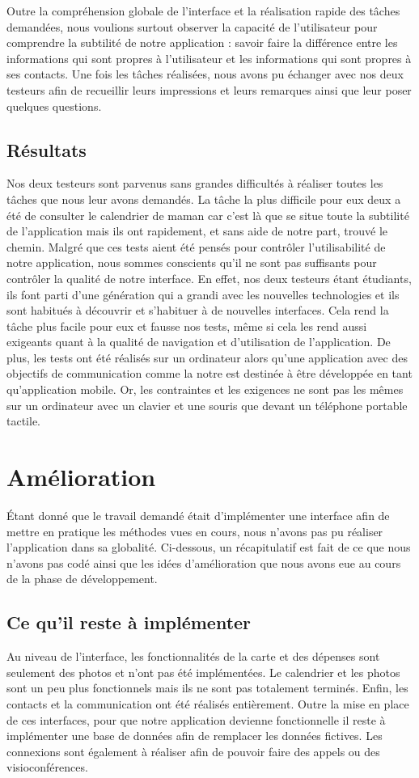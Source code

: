 \documentclass[11pt]{article}
\begin{document}
Outre la compréhension globale de l'interface et la réalisation rapide des tâches demandées, nous voulions surtout observer la capacité de l'utilisateur pour comprendre la subtilité de notre application : savoir faire la différence entre les informations qui sont propres à l'utilisateur et les informations qui sont propres à ses contacts. Une fois les tâches réalisées, nous avons pu échanger avec nos deux testeurs afin de recueillir leurs impressions et leurs remarques ainsi que leur poser quelques questions.

\subsection{Résultats}
Nos deux testeurs sont parvenus sans grandes difficultés à réaliser toutes les tâches que nous leur avons demandés. La tâche la plus difficile pour eux deux a été de consulter le calendrier de maman car c'est là que se situe toute la subtilité de l'application mais ils ont rapidement, et sans aide de notre part, trouvé le chemin. 
Malgré que ces tests aient été pensés pour contrôler l'utilisabilité de notre application, nous sommes conscients qu'il ne sont pas suffisants pour contrôler la qualité de notre interface. En effet, nos deux testeurs étant étudiants, ils font parti d'une génération qui a grandi avec les nouvelles technologies et ils sont habitués à découvrir et s'habituer à de nouvelles interfaces. Cela rend la tâche plus facile pour eux et fausse nos tests, même si cela les rend aussi exigeants quant à la qualité de navigation et d'utilisation de l'application. De plus, les tests ont été réalisés sur un ordinateur alors qu'une application avec des objectifs de communication comme la notre est destinée à être développée en tant qu'application mobile. Or, les contraintes et les exigences ne sont pas les mêmes sur un ordinateur avec un clavier et une souris que devant un téléphone portable tactile.

\section{Amélioration}
Étant donné que le travail demandé était d’implémenter une interface afin de mettre en pratique les méthodes vues en cours, nous n’avons pas pu réaliser l’application dans sa globalité. Ci-dessous, un récapitulatif est fait de ce que nous n’avons pas codé ainsi que les idées d’amélioration que nous avons eue au cours de la phase de développement.
\subsection{Ce qu'il reste à implémenter}
Au niveau de l'interface, les fonctionnalités de la carte et des dépenses sont seulement des photos et n'ont pas été implémentées. Le calendrier et les photos sont un peu plus fonctionnels mais  ils ne sont pas totalement terminés. Enfin, les contacts et la communication ont été réalisés entièrement.
Outre la mise en place de ces interfaces, pour que notre application devienne fonctionnelle il reste à implémenter une base de données afin de remplacer les données fictives. Les connexions sont également à réaliser afin de pouvoir faire des appels ou des visioconférences.
\end{document}
